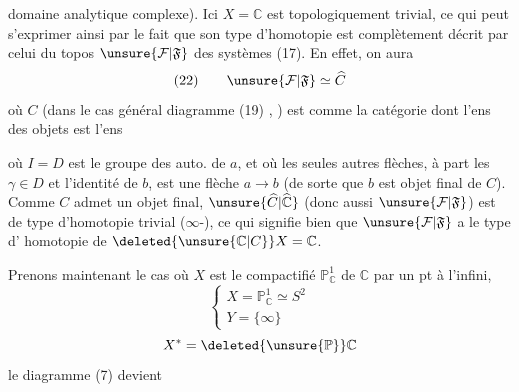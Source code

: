 domaine analytique complexe). Ici
$X=\mathbb C$ est topologiquement trivial, ce qui
peut s'exprimer ainsi par le fait que
son type d'homotopie est complètement
décrit par celui du topos $\unsure{\mathcal F|\mathfrak F}$ des
systèmes (17). En effet, on aura
\[
(22)\qquad \unsure{\mathcal F|\mathfrak F}\simeq\widehat C
\]
où $C$ (dans le cas général  diagramme
(19) 
,
) est  comme la catégorie dont
l'ens des objets est l'ens 

où $I=D$ est le groupe des auto. de $a$, et où
les seules autres flèches, à part les $\gamma\in D$ et
l'identité de $b$, est une flèche $a\longrightarrow b$ (de
sorte que $b$ est objet final de $C$). Comme
$C$ admet un objet final, $\unsure{\widehat C|\widehat{\mathbb C}}$  (donc aussi
$\unsure{\mathcal F|\mathfrak F}$) est de type d'homotopie trivial ($\infty$-),
ce qui signifie bien que $\unsure{\mathcal F|\mathfrak F}$ a le type d'
homotopie de $\deleted{\unsure{\mathbb C|C}}X=\mathbb C$.

Prenons maintenant le cas où $X$ est le
compactifié $\mathbb P^1_{\mathbb C}$ de $\mathbb C$ par un pt à l'infini,
\[
\left\{\begin{array}{l}
X=\mathbb P^1_{\mathbb C}\simeq S^2\\
Y=\{\infty\}
\end{array}\right.
\]
\[
X^*=\deleted{\unsure{\mathbb P}}\mathbb C
\]
le diagramme (7) devient

